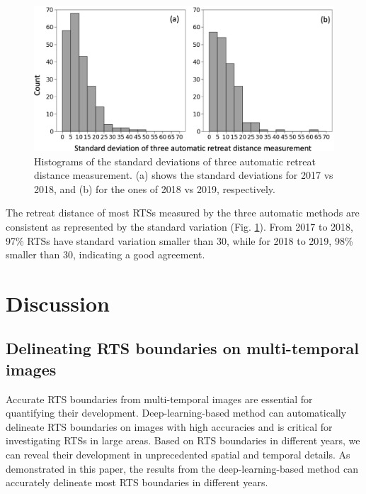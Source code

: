 \documentclass[authoryear,preprint,review,12pt]{elsarticle}
\begin{document}
\begin{figure} 
	\centering
	\includegraphics[width=14cm]{figs/standard_deviation_trim.jpg}
	\caption{Histograms of the standard deviations of three automatic retreat distance measurement. (a) shows the standard deviations for 2017 vs 2018, and (b) for the ones of 2018 vs 2019, respectively.}
	\label{fig_re_dis_standard_var}
\end{figure}

The retreat distance of most RTSs measured by the three automatic methods are consistent as represented by the standard variation (Fig. \ref{fig_re_dis_standard_var}).
From 2017 to 2018, 97\% RTSs have standard variation smaller than 30, while for 2018 to 2019, 98\% smaller than 30, indicating a good agreement. 

 

 

\section{Discussion}
\label{sec_discussion}

\subsection{Delineating RTS boundaries on multi-temporal images}
\label{sec_diss_mapping_rts_multi_images}

Accurate RTS boundaries from multi-temporal images are essential for quantifying their development.
Deep-learning-based method can automatically delineate RTS boundaries on images with high accuracies and is critical for investigating RTSs in large areas. 
Based on RTS boundaries in different years, we can reveal their development in unprecedented spatial and temporal details. 
As demonstrated in this paper, the results from the deep-learning-based method can accurately delineate most RTS boundaries in different years. %
\end{document}
